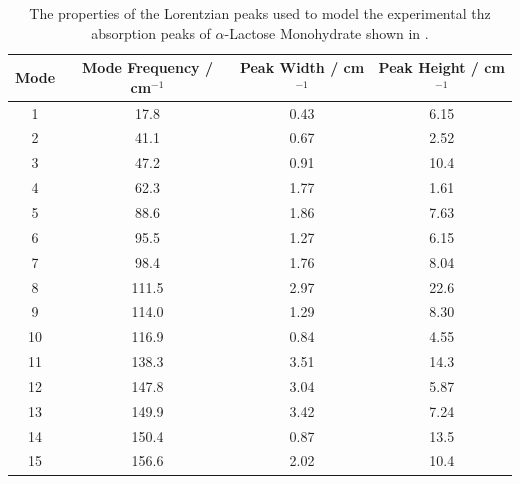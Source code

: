 \begin{table}
\centering
\begin{tabular}{@{}cccc@{}}
\toprule
Mode & Mode Frequency / cm\({^{-1}}\) & Peak Width / cm\({^{-1}}\) & Peak Height / cm\({^{-1}}\) \\ \midrule
1 &
17.8 &
0.43 &
6.15 \\

2 &
41.1 &
0.67 &
2.52 \\

3 &
47.2 & 
0.91 &
10.4 \\

4 &
62.3 &
1.77 &
1.61 \\

5 &
88.6 &
1.86 &
7.63 \\

6 &
95.5 &
1.27 &
6.15 \\

7 &
98.4 &
1.76 &
8.04 \\

8 &
111.5 &
2.97 &
22.6 \\

9 &
114.0 &
1.29 &
8.30 \\

10 &
116.9 &
0.84 &
4.55 \\

11 &
138.3 &
3.51 &
14.3 \\

12 &
147.8 &
3.04 &
5.87\\

13 &
149.9 &
3.42 &
7.24 \\
 
14 &
150.4 &
0.87 &
13.5 \\
  
15 &
156.6 &
2.02 &
10.4 \\ \bottomrule
\end{tabular}
\captionsetup{font = footnotesize, justification = centering}
\caption[The Properties of the Lorentzian Peaks used to Model the Experimental Terahertz Absorption Peaks of \(\alpha\)-Lactose Monohydrate]{The properties of the Lorentzian peaks used to model the experimental \acrshort{thz} absorption peaks of \(\alpha\)-Lactose Monohydrate shown in .}
\label{tab:exp_peak_widths}
\end{table}

